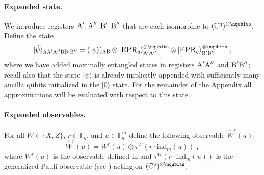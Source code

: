 \documentclass[11pt]{article}
\theoremstyle{definition}
\newcommand{\ket}[1]{|#1\rangle}
\newcommand{\C}{\ensuremath{\mathbb{C}}}
\newcommand{\F}{\ensuremath{\mathbb{F}}}
\newcommand{\ind}{\ensuremath{\mathrm{ind}}}
\newcommand{\labelstyle}[1]{\ensuremath{\textsc{#1}}\xspace}
\newcommand{\EPR}{\labelstyle{EPR}}
\newcommand{\alice}{\labelstyle{A}}
\newcommand{\bob}{\labelstyle{B}}
\begin{document}
\paragraph{Expanded state.} We introduce registers $\alice', \alice'', \bob', \bob''$ that are each isomorphic to $(\C^q)^{\otimes \nqubits}$. Define the state \begin{equation}\label{eq:def-psihat}
	\ket{\hat{\psi}}_{\alice \alice' \alice'' \bob \bob' \bob''} = (\ket{\psi})_{\alice \bob} \otimes \ket{\EPR_q}^{\otimes \nqubits}_{\alice' \alice''} \otimes \ket{\EPR_q}^{\otimes \nqubits}_{\bob' \bob''}\;,
\end{equation}
where we have added maximally entangled states in registers
$\alice' \alice''$ and $\bob' \bob''$; recall also that the state $\ket{\psi}$ is already implicitly  appended with sufficiently many ancilla qubits initialized in the $\ket{0}$ state. 
For the remainder of the Appendix all approximations will be evaluated with respect to this state.

\paragraph{Expanded observables.} For all $W \in \{X,Z\}$, $r \in \F_q$, and $u \in \F_q^m$ define the following observable $\hat{W}^r(u)$: \begin{equation}\label{eq:lc-23}
	\hat{W}^r(u) = W^r(u) \otimes \tau^W(r \cdot \ind_m(u))\;,
\end{equation}
where $W^r(u)$ is the observable defined in  and $\tau^W(r \cdot \ind_m(u))$ is the generalized Pauli observable (see ) acting on $(\C^q)^{\otimes \nqubits}$. 
\end{document}
